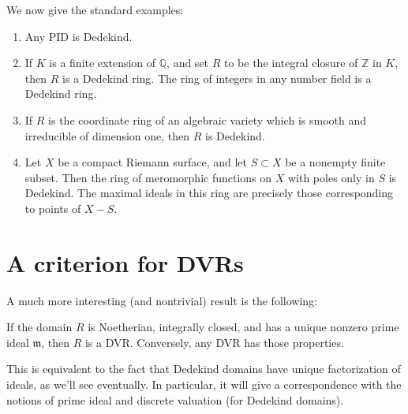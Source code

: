 We now give the standard examples:
\begin{example} 
\begin{enumerate}
\item Any PID is Dedekind.  
\item If $K$ is a finite extension of $\mathbb{Q}$, and set $R $ to be the
integral closure of $\mathbb{Z}$ in $K$, then $R$ is a Dedekind ring. The ring
of integers in any number field is a Dedekind ring. 
\item If $R$ is the coordinate ring of an algebraic variety which is smooth and
irreducible of dimension one, then $R$ is Dedekind. 
\item  Let $X$ be a compact Riemann surface, and let $S \subset X$ be a
nonempty finite subset. Then the ring of meromorphic functions on $X$ with
poles only in $S$ is
Dedekind. The maximal ideals in this ring are precisely those corresponding to
points of $X-S$. 
\end{enumerate}
\end{example} 


\section{A criterion for DVRs}


A much more interesting (and nontrivial) result is the following:
\begin{theorem} \label{niupmeansdvr} If the domain $R$ is Noetherian, integrally closed, and has a unique nonzero prime ideal $\mathfrak{m}$, then $R$ is a DVR.  Conversely, any DVR has those properties.
\end{theorem}
This is equivalent to the fact that Dedekind domains have unique factorization of ideals, as we'll see eventually.  In particular, it will give a correspondence with the notions of prime ideal and discrete valuation (for Dedekind domains).

